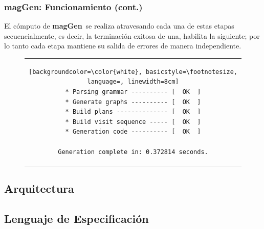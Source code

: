 \documentclass[10pt, xcolor=table, xcolor=dvipsnames]{beamer}
\newcommand{\maggen}{\textbf{magGen}}
\begin{document}
\begin{frame}[fragile]
    \frametitle{\maggen: Funcionamiento (cont.)}

    El cómputo de \maggen\ se realiza atravesando cada una de estas etapas secuencialmente, es decir, la terminación exitosa de una, habilita la siguiente; por lo tanto cada etapa mantiene su salida de errores de manera independiente. 

\begin{figure}[h]
\begin{center}
\begin{tabular}{c}
\begin{lstlisting}[backgroundcolor=\color{white}, basicstyle=\footnotesize, language=, linewidth=8cm]
* Parsing grammar ---------- [  OK  ]
* Generate graphs ---------- [  OK  ]
* Build plans -------------- [  OK  ]
* Build visit sequence ----- [  OK  ]
* Generation code ---------- [  OK  ]

Generation complete in: 0.372814 seconds.
\end{lstlisting}
\end{tabular}
\end{center}
\end{figure}
\end{frame}

\subsection*{Arquitectura}


\subsection{Lenguaje de Especificación}
\end{document}
